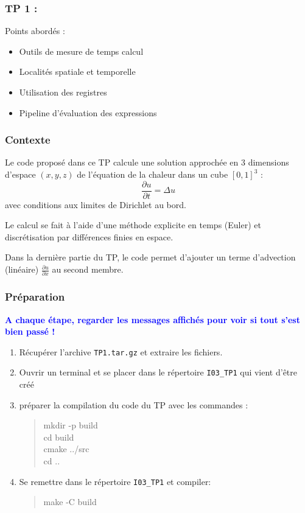 \documentclass{beamer}
\begin{document}
\begin{frame}
	\frametitle{TP 1 :}
	\vfill
	\Large
	Points abord\'es :
	\vfill
	\begin{itemize}
		\item Outils de mesure de temps calcul
		\bigskip
		\item Localit\'es spatiale et temporelle
		\bigskip
		\item Utilisation des registres
		\bigskip
		\item Pipeline d'\'evaluation des expressions
	\end{itemize}
	\vfill
\end{frame}

\begin{frame}
\frametitle{Contexte}
	
	Le code propos\'e dans ce TP calcule une solution approch\'ee en 3 dimensions d'espace $(x,y,z)$ de l'\'equation de la chaleur dans un cube $[0,1]^3$ :
	$$
	\frac{\partial u}{\partial t} = \Delta u
	$$
	avec conditions aux limites de Dirichlet au bord.
	\vfill
	
	Le calcul se fait \`a l'aide d'une m\'ethode explicite en temps (Euler) et discr\'etisation par diff\'erences finies en espace.
	
	\vfill
	Dans la derni\`ere partie du TP, le code permet d'ajouter un terme d'advection (linéaire) $\frac{\displaystyle\partial u}{\displaystyle\partial x}$ au second membre.
	
	\vfill
	
\end{frame}

\begin{frame}
\frametitle{Pr\'eparation}
	
	\vfill
	\textcolor{blue}{\bf A chaque \'etape, regarder les messages affich\'es pour voir si tout s'est bien pass\'e !}
	\vfill

	\begin{enumerate}
		\item R\'ecup\'erer l'archive {\tt TP1.tar.gz} et extraire les fichiers.
		\item Ouvrir un terminal et se placer dans le r\'epertoire {\tt I03\_TP1} \break qui vient d'\^etre cr\'e\'e
		\item préparer la compilation du code du TP avec les commandes :
		\begin{quote}
			mkdir -p build\\
			cd build\\
			cmake ../src\\
			cd ..
		\end{quote}
		\item Se remettre dans le r\'epertoire {\tt I03\_TP1} et compiler:
		\begin{quote}
			make -C build
		\end{quote}
	\end{enumerate}
	\vfill
	
\end{frame}
\end{document}
